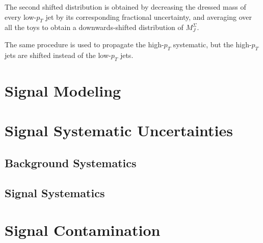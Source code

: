 The second
shifted distribution is obtained by decreasing the dressed mass of every
low-$p_T$ jet by its corresponding fractional uncertainty, and
averaging over all the toys to obtain a downwards-shifted distribution
of $M_{J}^{\Sigma}$. 

The same procedure is used to propagate the high-$p_T$ systematic, but
the high-$p_T$ jets are shifted instead of the low-$p_T$ jets.

\section{Signal Modeling}
\section{Signal Systematic Uncertainties}
\subsection{Background Systematics}
\subsection{Signal Systematics}
\section{Signal Contamination}
